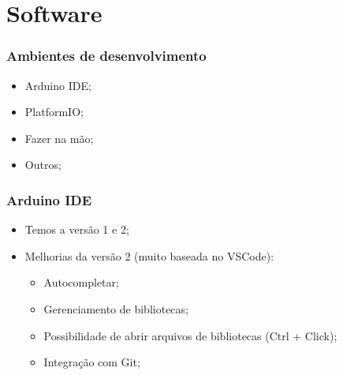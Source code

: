 \documentclass[12pt]{beamer}
\begin{document}

\section{Software}

\begin{frame}
    \frametitle{Ambientes de desenvolvimento}
    \begin{itemize}
        \item Arduino IDE\@;
        \item PlatformIO\@;
        \item Fazer na mão;
        \item Outros;
    \end{itemize}
\end{frame}

\begin{frame}
    \frametitle{Arduino IDE}

    \begin{itemize}
        \item Temos a versão 1 e 2;
        \item Melhorias da versão 2 (muito baseada no VSCode):
        \begin{itemize}
            \item Autocompletar;
            \item Gerenciamento de bibliotecas;
            \item Possibilidade de abrir arquivos de bibliotecas (Ctrl + Click);
            \item Integração com Git;
        \end{itemize}
    \end{itemize}
\end{frame}
\end{document}
